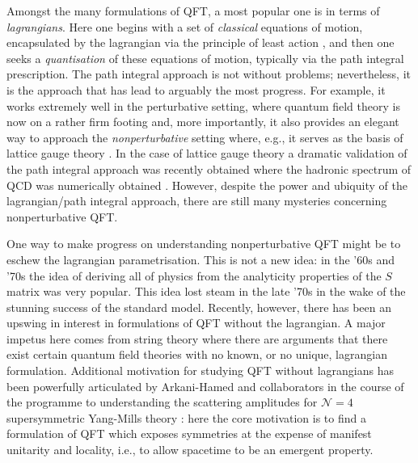 \documentclass[11pt]{amsart}
\theoremstyle{plain}%
\theoremstyle{definition}
\theoremstyle{remark}
\begin{document}
Amongst the many formulations of QFT, a most popular one is in terms of \emph{lagrangians}. Here one begins with a set of \emph{classical} equations of motion, encapsulated by the lagrangian via the principle of least action \cite{arnold_mathematical_1989}, and then one seeks a \emph{quantisation} of these equations of motion, typically via the path integral prescription. The path integral approach is not without problems; nevertheless, it is the approach that has lead to arguably the most progress. For example, it works extremely well in the perturbative setting, where quantum field theory is now on a rather firm footing and, more importantly, it also provides an elegant way to approach the \emph{nonperturbative} setting where, e.g., it serves as the basis of lattice gauge theory \cite{creutz_quarks_1985,wilson_confinement_1974}. In the case of lattice gauge theory a dramatic validation of the path integral approach was recently obtained where the hadronic spectrum of QCD was numerically obtained \cite{durr_ab_2008}. However, despite the power and ubiquity of the lagrangian/path integral approach, there are still many mysteries concerning nonperturbative QFT.  

One way to make progress on understanding nonperturbative QFT might be to eschew the lagrangian parametrisation. This is not a new idea: in the '60s and '70s the idea of deriving all of physics from the analyticity properties \cite{eden_analytic_2002} of the $S$ matrix was very popular. This idea lost steam in the late '70s in the wake of the stunning success of the standard model. Recently, however, there has been an upswing in interest in formulations of QFT without the lagrangian. A major impetus here comes from string theory \cite{moore_physical_2014,howard_georgi_particles_2012} where there are arguments that there exist certain quantum field theories \cite{witten_comments_1995,moore_lecture_2012} with no known, or no unique, lagrangian formulation. Additional motivation for studying QFT without lagrangians has been powerfully articulated by Arkani-Hamed and collaborators in the course of the programme to understanding the scattering amplitudes for $\mathcal{N}=4$ supersymmetric Yang-Mills theory \cite{arkani-hamed_what_2010,arkani-hamed_into_2014,arkani-hamed_tree_2008,arkani-hamed_scattering_2012,arkani-hamed_all-loop_2011,arkani-hamed_amplituhedron_2014,arkani-hamed_s-matrix_2010,arkani-hamed_what_2010}: here the core motivation is to find a formulation of QFT which exposes symmetries at the expense of  manifest unitarity and locality, i.e., to allow spacetime to be an emergent property.  
\end{document}
